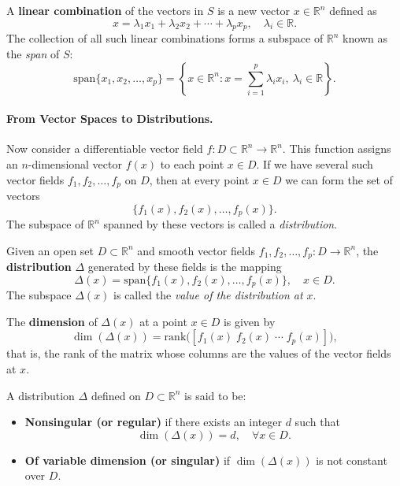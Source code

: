 A \textbf{linear combination} of the vectors in $S$ is a new vector $x \in \mathbb{R}^n$ defined as
\[
x = \lambda_1 x_1 + \lambda_2 x_2 + \cdots + \lambda_p x_p, \quad \lambda_i \in \mathbb{R}.
\]
The collection of all such linear combinations forms a subspace of $\mathbb{R}^n$ known as the \emph{span} of $S$:
\[
\mathrm{span}\{x_1, x_2, \ldots, x_p\} = 
\left\{ x \in \mathbb{R}^n : x = \sum_{i=1}^{p} \lambda_i x_i, \ \lambda_i \in \mathbb{R} \right\}.
\]

\paragraph{From Vector Spaces to Distributions.}
Now consider a differentiable vector field $f : D \subset \mathbb{R}^n \to \mathbb{R}^n$.  
This function assigns an $n$-dimensional vector $f(x)$ to each point $x \in D$.  
If we have several such vector fields $f_1, f_2, \ldots, f_p$ on $D$,  
then at every point $x \in D$ we can form the set of vectors
\[
\{ f_1(x), f_2(x), \ldots, f_p(x) \}.
\]
The subspace of $\mathbb{R}^n$ spanned by these vectors is called a \emph{distribution}.

\begin{definition}[Distribution]\label{def:distribution}
Given an open set $D \subset \mathbb{R}^n$ and smooth vector fields  
$f_1, f_2, \ldots, f_p : D \to \mathbb{R}^n$,  
the \textbf{distribution} $\Delta$ generated by these fields is the mapping
\[
\Delta(x) = \mathrm{span}\{ f_1(x), f_2(x), \ldots, f_p(x) \}, \quad x \in D.
\]
The subspace $\Delta(x)$ is called the \emph{value of the distribution at $x$}.
\end{definition}

The \textbf{dimension} of $\Delta(x)$ at a point $x \in D$ is given by
\[
\dim(\Delta(x)) = \mathrm{rank} \big( [ f_1(x) \; f_2(x) \; \cdots \; f_p(x) ] \big),
\]
that is, the rank of the matrix whose columns are the values of the vector fields at $x$.

\begin{definition}\label{def:regular_singular_distribution}
A distribution $\Delta$ defined on $D \subset \mathbb{R}^n$ is said to be:
\begin{itemize}
    \item \textbf{Nonsingular (or regular)} if there exists an integer $d$ such that
    \[
    \dim(\Delta(x)) = d, \quad \forall x \in D.
    \]
    \item \textbf{Of variable dimension (or singular)} if $\dim(\Delta(x))$ is not constant over $D$.
\end{itemize}
\end{definition}

